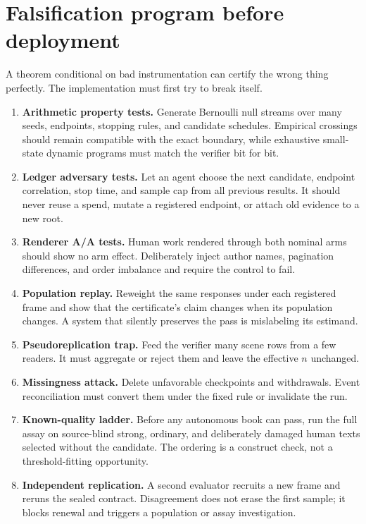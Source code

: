 \documentclass[11pt]{article}
\theoremstyle{remark}
\begin{document}
\section{Falsification program before deployment}

A theorem conditional on bad instrumentation can certify the wrong thing perfectly. The
implementation must first try to break itself.

\begin{enumerate}
  \item \textbf{Arithmetic property tests.} Generate Bernoulli null streams over many seeds,
  endpoints, stopping rules, and candidate schedules. Empirical crossings should remain
  compatible with the exact boundary, while exhaustive small-state dynamic programs must
  match the verifier bit for bit.
  \item \textbf{Ledger adversary tests.} Let an agent choose the next candidate, endpoint
  correlation, stop time, and sample cap from all previous results. It should never reuse a
  spend, mutate a registered endpoint, or attach old evidence to a new root.
  \item \textbf{Renderer A/A tests.} Human work rendered through both nominal arms should show
  no arm effect. Deliberately inject author names, pagination differences, and order imbalance
  and require the control to fail.
  \item \textbf{Population replay.} Reweight the same responses under each registered frame
  and show that the certificate's claim changes when its population changes. A system that
  silently preserves the pass is mislabeling its estimand.
  \item \textbf{Pseudoreplication trap.} Feed the verifier many scene rows from a few readers.
  It must aggregate or reject them and leave the effective $n$ unchanged.
  \item \textbf{Missingness attack.} Delete unfavorable checkpoints and withdrawals. Event
  reconciliation must convert them under the fixed rule or invalidate the run.
  \item \textbf{Known-quality ladder.} Before any autonomous book can pass, run the full assay
  on source-blind strong, ordinary, and deliberately damaged human texts selected without the
  candidate. The ordering is a construct check, not a threshold-fitting opportunity.
  \item \textbf{Independent replication.} A second evaluator recruits a new frame and reruns
  the sealed contract. Disagreement does not erase the first sample; it blocks renewal and
  triggers a population or assay investigation.
\end{enumerate}
\end{document}
